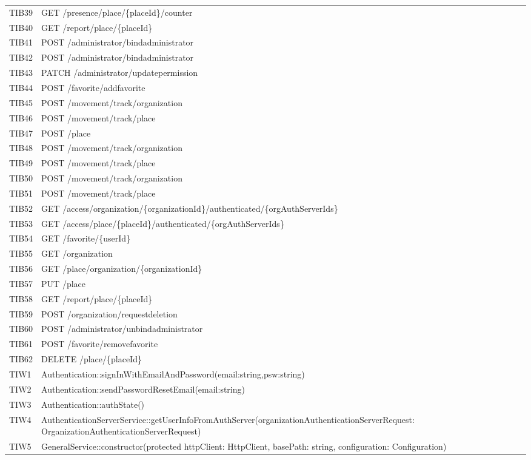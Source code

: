 {\begin{longtable}{C{2cm} C{12cm}}
	TIB39 & GET /presence/place/\{placeId\}/counter \\
	TIB40 & GET /report/place/\{placeId\} \\
	TIB41 & POST /administrator/bindadministrator \\
	TIB42 & POST /administrator/bindadministrator \\
	TIB43 & PATCH /administrator/updatepermission \\
	TIB44 & POST /favorite/addfavorite \\
	TIB45 & POST /movement/track/organization \\
	TIB46 & POST /movement/track/place \\
	TIB47 & POST /place \\
	TIB48 & POST /movement/track/organization \\
	TIB49 & POST /movement/track/place \\
	TIB50 & POST /movement/track/organization \\
	TIB51 & POST /movement/track/place \\
	TIB52 & GET /access/organization/\{organizationId\}/authenticated/\{orgAuthServerIds\} \\
	TIB53 & GET /access/place/\{placeId\}/authenticated/\{orgAuthServerIds\} \\
	TIB54 & GET /favorite/\{userId\} \\
	TIB55 & GET /organization \\
	TIB56 & GET /place/organization/\{organizationId\} \\
	TIB57 & PUT /place \\
	TIB58 & GET /report/place/\{placeId\} \\
	TIB59 & POST /organization/requestdeletion \\
	TIB60 & POST /administrator/unbindadministrator \\
	TIB61 & POST /favorite/removefavorite \\
	TIB62 & DELETE /place/\{placeId\} \\
	TIW1 & Authentication::signInWithEmailAndPassword(email:string,psw:string) \\
	TIW2 & Authentication::sendPasswordResetEmail(email:string) \\
	TIW3 & Authentication::authState()\\
	TIW4 & AuthenticationServerService::getUserInfoFromAuthServer(organizationAuthenticationServerRequest: OrganizationAuthenticationServerRequest) \\
	TIW5 & GeneralService::constructor(protected httpClient: HttpClient, basePath: string, configuration: Configuration) \\

\end{longtable}}

